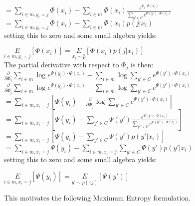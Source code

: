 \documentclass[]{article}
\begin{document}
$ = \underset{i \in m, y_i = j}{\sum} \Phi(x_i) -  \underset{i \in m}{\sum} \Phi(x_i) \frac{e^{\Psi_j \cdot \Phi(x_i)}}{\sum_{y\prime \in C}e^{\Psi(y') \cdot \Phi(x_i)}}$\\

$ = \underset{i \in m, y_i = j}{\sum} \Phi(x_i) -  \underset{i \in m}{\sum} \Phi(x_i) p(j|x_i)$\\

\noindent setting this to zero and some small algebra yields:

$\underset{i \in m, y_i = j}{E}\left[\Phi(x_i)\right] = \underset{x_i \sim \hat{p}}{E}\left[\Phi(x_i) p(j|x_i)\right]$\\

\noindent The partial derivative with respect to $\Phi_j$ is then:\\

$\frac{\partial}{\partial \Phi_j} \underset{i \in m}{\sum} \log e^{\Psi(y_i) \cdot \Phi(x_i)} - \underset{i \in m}{\sum} \log \sum_{y\prime \in C}e^{\Psi(y') \cdot \Phi(x_i)}$\\

$\frac{\partial}{\partial \Phi_j} \underset{i \in m}{\sum} \log e^{\Psi(y_i) \cdot \Phi(x_i)} - \underset{i \in m}{\sum} \log \sum_{y\prime \in C}e^{\Psi(y') \cdot \Phi(x_i)}$\\

$ = \underset{i \in m, x_i = j}{\sum} \left[\Psi(y_i) - \frac{\partial}{\partial \Phi_j} \log \sum_{y\prime \in C}e^{\Psi(y\prime) \cdot \Phi(x_i)}\right]$\\

$ = \underset{i \in m, x_i = j}{\sum} \left[\Psi(y_i) - \sum_{y\prime \in C}\Psi(y') \frac{e^{\Psi(y') \cdot \Phi(x_i)}}{\sum_{y\prime\prime \in C}e^{\Psi(y\prime\prime) \cdot \Phi(x_i)}}\right]$\\

$ = \underset{i \in m, x_i = j}{\sum} \left[\Psi(y_i) - \sum_{y\prime \in C}\Psi(y') p(y\prime|x_i)\right]$\\

$ = \underset{i \in m, x_i = j}{\sum} \Psi(y_i) - \underset{i \in m, x_i = j}{\sum} \sum_{y\prime \in C}\Psi(y') p(y\prime|x_i)$\\

\noindent setting this to zero and some small algebra yields:

$\underset{i \in m, x_i = j}{E}\left[\Psi(y_i)\right] = \underset{y\prime \sim p(\cdot|j)}{E}\left[\Psi(y\prime)\right]$

\noindent This motivates the following Maximum Entropy formulation.
\end{document}
